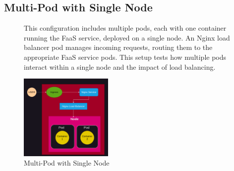 \documentclass{article}
\begin{document}
\subsection{Multi-Pod with Single Node}
\nobreak
\begin{figure}[h]
    \begin{minipage}[b]{0.6\textwidth}
        \flushleft
        This configuration includes multiple pods, each with one container running the
        FaaS service, deployed on a single node. An Nginx load balancer pod manages
        incoming requests, routing them to the appropriate FaaS service pods. This
        setup tests how multiple pods interact within a single node and the impact of
        load balancing.
    \end{minipage}%
    \hfill
    \begin{minipage}[b]{0.4\textwidth}
        \centering
        \includegraphics[width=0.4\textwidth]{../images/one_node_two_pod.png}
        \caption{Multi-Pod with Single Node}
        \label{fig:multi_pod_single_node}
    \end{minipage}
\end{figure}
\end{document}
